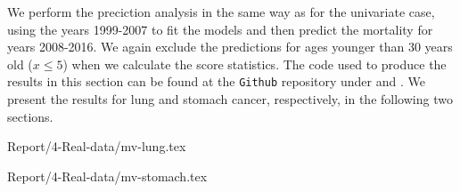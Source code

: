 


\newpar We perform the preciction analysis in the same way as for the univariate case, using the years 1999-2007 to fit the models and then predict the mortality for years 2008-2016. We again exclude the predictions for ages younger than 30 years old ($x \leq 5$) when we calculate the score statistics. The code used to produce the results in this section can be found at the \texttt{Github} repository under  and . We present the results for lung and stomach cancer, respectively, in the following two sections.

{Report/4-Real-data/mv-lung.tex}

{Report/4-Real-data/mv-stomach.tex}

